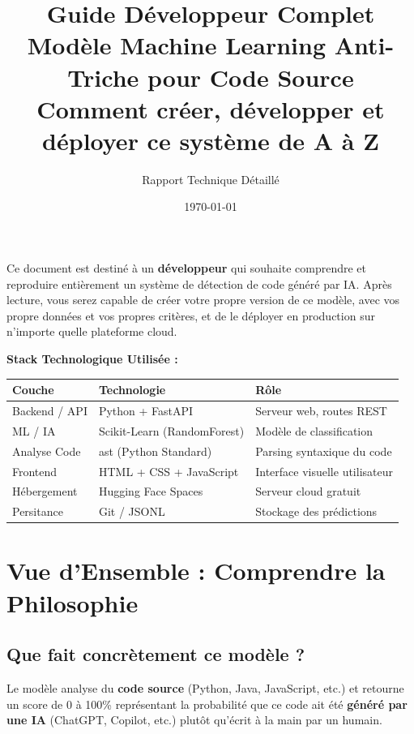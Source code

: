 \documentclass[a4paper,11pt]{article}
\title{%
    \textbf{\Huge Guide Développeur Complet}\\[0.5em]
    \Large Modèle Machine Learning Anti-Triche pour Code Source\\[0.5em]
    \large Comment créer, développer et déployer ce système de A à Z
}
\author{Rapport Technique Détaillé}
\date{\today}
\begin{document}
\maketitle
\thispagestyle{empty}

\begin{center}
\begin{tcolorbox}[colback=primary!5!white, colframe=primary, title=\textbf{Pour qui est ce guide ?}]
Ce document est destiné à un \textbf{développeur} qui souhaite comprendre et reproduire entièrement
un système de détection de code généré par IA. Après lecture, vous serez capable de créer
votre propre version de ce modèle, avec vos propre données et vos propres critères, et de le déployer en production sur n'importe quelle plateforme cloud.
\end{tcolorbox}
\end{center}

\vspace{1em}
\begin{center}
\textbf{Stack Technologique Utilisée :}\\[0.5em]
\begin{tabular}{|l|l|l|}
\hline
\textbf{Couche} & \textbf{Technologie} & \textbf{Rôle} \\
\hline
Backend / API & Python + FastAPI & Serveur web, routes REST \\
ML / IA & Scikit-Learn (RandomForest) & Modèle de classification \\
Analyse Code & ast (Python Standard) & Parsing syntaxique du code \\
Frontend & HTML + CSS + JavaScript & Interface visuelle utilisateur \\
Hébergement & Hugging Face Spaces & Serveur cloud gratuit \\
Persitance & Git / JSONL & Stockage des prédictions \\
\hline
\end{tabular}
\end{center}

\newpage
\tableofcontents
\newpage


\section{Vue d'Ensemble : Comprendre la Philosophie}

\subsection{Que fait concrètement ce modèle ?}
Le modèle analyse du \textbf{code source} (Python, Java, JavaScript, etc.) et retourne un score
de 0 à 100\% représentant la probabilité que ce code ait été \textbf{généré par une IA} (ChatGPT, Copilot, etc.)
plutôt qu'écrit à la main par un humain.
\end{document}
